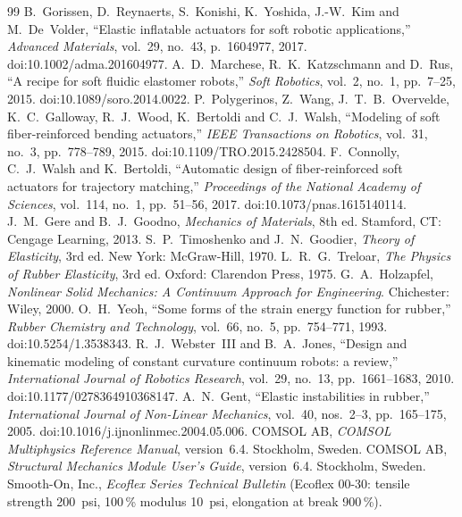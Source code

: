 \documentclass[12pt,a4paper,oneside]{report}
\numberwithin{equation}{chapter}
\numberwithin{figure}{chapter}
\numberwithin{table}{chapter}
\begin{document}
\renewcommand{\bibname}{References}
\begin{thebibliography}{99}
 B.~Gorissen, D.~Reynaerts, S.~Konishi, K.~Yoshida, J.-W.~Kim and M.~De~Volder,
``Elastic inflatable actuators for soft robotic applications,'' \emph{Advanced Materials}, vol.~29, no.~43,
p.~1604977, 2017. doi:10.1002/adma.201604977.
 A.~D.~Marchese, R.~K.~Katzschmann and D.~Rus, ``A recipe for soft fluidic elastomer
robots,'' \emph{Soft Robotics}, vol.~2, no.~1, pp.~7--25, 2015. doi:10.1089/soro.2014.0022.
 P.~Polygerinos, Z.~Wang, J.~T.~B.~Overvelde, K.~C.~Galloway, R.~J.~Wood, K.~Bertoldi
and C.~J.~Walsh, ``Modeling of soft fiber-reinforced bending actuators,'' \emph{IEEE Transactions on Robotics},
vol.~31, no.~3, pp.~778--789, 2015. doi:10.1109/TRO.2015.2428504.
 F.~Connolly, C.~J.~Walsh and K.~Bertoldi, ``Automatic design of fiber-reinforced soft
actuators for trajectory matching,'' \emph{Proceedings of the National Academy of Sciences}, vol.~114, no.~1,
pp.~51--56, 2017. doi:10.1073/pnas.1615140114.
 J.~M.~Gere and B.~J.~Goodno, \emph{Mechanics of Materials}, 8th ed. Stamford, CT: Cengage
Learning, 2013.
 S.~P.~Timoshenko and J.~N.~Goodier, \emph{Theory of Elasticity}, 3rd ed. New York:
McGraw-Hill, 1970.
 L.~R.~G.~Treloar, \emph{The Physics of Rubber Elasticity}, 3rd ed. Oxford: Clarendon
Press, 1975.
 G.~A.~Holzapfel, \emph{Nonlinear Solid Mechanics: A Continuum Approach for Engineering}.
Chichester: Wiley, 2000.
 O.~H.~Yeoh, ``Some forms of the strain energy function for rubber,'' \emph{Rubber Chemistry
and Technology}, vol.~66, no.~5, pp.~754--771, 1993. doi:10.5254/1.3538343.
 R.~J.~Webster~III and B.~A.~Jones, ``Design and kinematic modeling of constant curvature
continuum robots: a review,'' \emph{International Journal of Robotics Research}, vol.~29, no.~13,
pp.~1661--1683, 2010. doi:10.1177/0278364910368147.
 A.~N.~Gent, ``Elastic instabilities in rubber,'' \emph{International Journal of Non-Linear
Mechanics}, vol.~40, nos.~2--3, pp.~165--175, 2005. doi:10.1016/j.ijnonlinmec.2004.05.006.
 COMSOL AB, \emph{COMSOL Multiphysics Reference Manual}, version~6.4. Stockholm, Sweden.
 COMSOL AB, \emph{Structural Mechanics Module User's Guide}, version~6.4. Stockholm,
Sweden.
 Smooth-On, Inc., \emph{Ecoflex Series Technical Bulletin} (Ecoflex 00-30: tensile strength
200~psi, 100\,\% modulus 10~psi, elongation at break 900\,\%).
\end{thebibliography}
\end{document}
